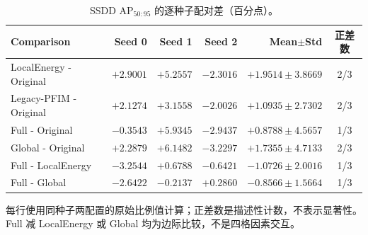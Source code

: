 \begin{table}[tp]
\centering\small
\setlength{\tabcolsep}{4pt}
\caption{SSDD AP$_{50:95}$ 的逐种子配对差（百分点）。}\label{tab:paired_ablation}
\begin{tabular*}{\textwidth}{@{\extracolsep{\fill}}lrrrrc}
\toprule
Comparison & Seed 0 & Seed 1 & Seed 2 & Mean$\pm$Std & 正差数\\
\midrule
LocalEnergy - Original & $+2.9001$ & $+5.2557$ & $-2.3016$ & $+1.9514\pm3.8669$ & 2/3 \\
Legacy-PFIM - Original & $+2.1274$ & $+3.1558$ & $-2.0026$ & $+1.0935\pm2.7302$ & 2/3 \\
Full - Original & $-0.3543$ & $+5.9345$ & $-2.9437$ & $+0.8788\pm4.5657$ & 1/3 \\
Global - Original & $+2.2879$ & $+6.1482$ & $-3.2297$ & $+1.7355\pm4.7133$ & 2/3 \\
Full - LocalEnergy & $-3.2544$ & $+0.6788$ & $-0.6421$ & $-1.0726\pm2.0016$ & 1/3 \\
Full - Global & $-2.6422$ & $-0.2137$ & $+0.2860$ & $-0.8566\pm1.5664$ & 1/3 \\
\bottomrule
\end{tabular*}
\smallskip
\begin{minipage}{\linewidth}\footnotesize
每行使用同种子两配置的原始比例值计算；正差数是描述性计数，不表示显著性。Full 减 LocalEnergy 或 Global 均为边际比较，不是四格因素交互。
\end{minipage}
\end{table}
